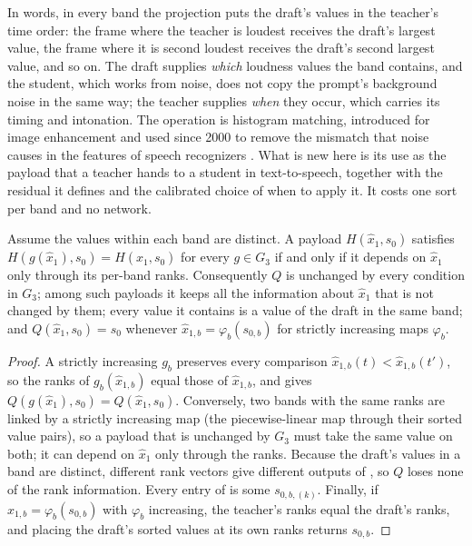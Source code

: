 In words, in every band the projection puts the draft's values in the teacher's time order: the frame where the teacher is loudest receives the draft's largest value, the frame where it is second loudest receives the draft's second largest value, and so on. The draft supplies \emph{which} loudness values the band contains, and the student, which works from noise, does not copy the prompt's background noise in the same way; the teacher supplies \emph{when} they occur, which carries its timing and intonation. The operation is histogram matching, introduced for image enhancement \parencite{hall1974histogram} and used since 2000 to remove the mismatch that noise causes in the features of speech recognizers \parencite{dharanipragada2000nonlinear,delatorre2005histogram,hilger2006quantile}. What is new here is its use as the payload that a teacher hands to a student in text-to-speech, together with the residual it defines and the calibrated choice of when to apply it. It costs one sort per band and no network.

\begin{proposition}\label{prop:invariance}
Assume the values within each band are distinct. A payload $H(\hat x_1,s_0)$ satisfies $H(g(\hat x_1),s_0)=H(\hat x_1,s_0)$ for every $g\in G_3$ if and only if it depends on $\hat x_1$ only through its per-band ranks. Consequently $Q$ is unchanged by every condition in $G_3$; among such payloads it keeps all the information about $\hat x_1$ that is not changed by them; every value it contains is a value of the draft in the same band; and $Q(\hat x_1,s_0)=s_0$ whenever $\hat x_{1,b}=\varphi_b(s_{0,b})$ for strictly increasing maps $\varphi_b$.
\end{proposition}
\begin{proof}
A strictly increasing $g_b$ preserves every comparison $\hat x_{1,b}(t)<\hat x_{1,b}(t')$, so the ranks of $g_b(\hat x_{1,b})$ equal those of $\hat x_{1,b}$, and  gives $Q(g(\hat x_1),s_0)=Q(\hat x_1,s_0)$. Conversely, two bands with the same ranks are linked by a strictly increasing map (the piecewise-linear map through their sorted value pairs), so a payload that is unchanged by $G_3$ must take the same value on both; it can depend on $\hat x_1$ only through the ranks. Because the draft's values in a band are distinct, different rank vectors give different outputs of , so $Q$ loses none of the rank information. Every entry of  is some $s_{0,b,(k)}$. Finally, if $\hat x_{1,b}=\varphi_b(s_{0,b})$ with $\varphi_b$ increasing, the teacher's ranks equal the draft's ranks, and placing the draft's sorted values at its own ranks returns $s_{0,b}$.
\end{proof}

